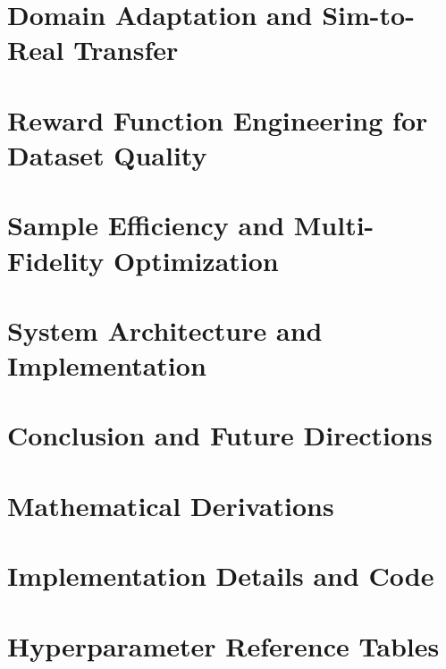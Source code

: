 \documentclass[11pt,twoside,openany]{book}
\theoremstyle{definition}
\theoremstyle{plain}
\theoremstyle{remark}
\begin{document}
\chapter{Domain Adaptation and Sim-to-Real Transfer}
\label{ch:domain_adaptation}


\chapter{Reward Function Engineering for Dataset Quality}
\label{ch:reward_functions}


\chapter{Sample Efficiency and Multi-Fidelity Optimization}
\label{ch:sample_efficiency}


\chapter{System Architecture and Implementation}
\label{ch:implementation}


\chapter{Conclusion and Future Directions}
\label{ch:conclusion}


\appendix
\chapter{Mathematical Derivations}
\label{appendix:math}


\chapter{Implementation Details and Code}
\label{appendix:code}


\chapter{Hyperparameter Reference Tables}
\label{appendix:hyperparams}


\backmatter



\end{document}

